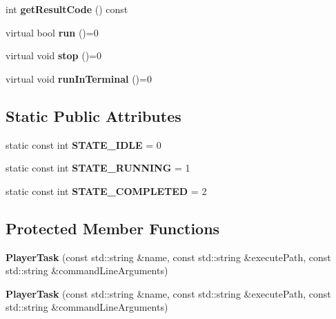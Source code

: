 \begin{DoxyCompactItemize}
int {\bfseries get\+Result\+Code} () const
\item 
\mbox{\label{classPlayerTask_a148643b29de4d5f87438a6feef0fa7a9}} 
virtual bool {\bfseries run} ()=0
\item 
\mbox{\label{classPlayerTask_ad0defdb52dd4d0b08a2f247f654738fc}} 
virtual void {\bfseries stop} ()=0
\item 
\mbox{\label{classPlayerTask_a149be49f504e7e5a965db58d96929cce}} 
virtual void {\bfseries run\+In\+Terminal} ()=0
\end{DoxyCompactItemize}
\subsection*{Static Public Attributes}
\begin{DoxyCompactItemize}
\item 
\mbox{\label{classPlayerTask_a71b4fde63ece96d0d55de3a6203a40fd}} 
static const int {\bfseries S\+T\+A\+T\+E\+\_\+\+I\+D\+LE} = 0
\item 
\mbox{\label{classPlayerTask_a703d0280f3327d9ad3fe454a15140bc1}} 
static const int {\bfseries S\+T\+A\+T\+E\+\_\+\+R\+U\+N\+N\+I\+NG} = 1
\item 
\mbox{\label{classPlayerTask_a4a0fa0dbb8dd68b6a94c7006ec4d18ab}} 
static const int {\bfseries S\+T\+A\+T\+E\+\_\+\+C\+O\+M\+P\+L\+E\+T\+ED} = 2
\end{DoxyCompactItemize}
\subsection*{Protected Member Functions}
\begin{DoxyCompactItemize}
\item 
\mbox{\label{classPlayerTask_a418fedec5a8bc8fb332d46e58fdc468e}} 
{\bfseries Player\+Task} (const std\+::string \&name, const std\+::string \&execute\+Path, const std\+::string \&command\+Line\+Arguments)
\item 
\mbox{\label{classPlayerTask_a418fedec5a8bc8fb332d46e58fdc468e}} 
{\bfseries Player\+Task} (const std\+::string \&name, const std\+::string \&execute\+Path, const std\+::string \&command\+Line\+Arguments)
\end{DoxyCompactItemize}
